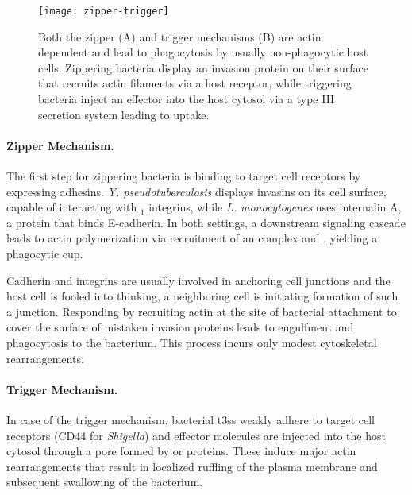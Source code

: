 \begin{figure}
  \centering
  \texttt{[image: zipper-trigger]}
  \caption[Zipper and trigger mechanisms for bacterial host-cell entry]{Both the zipper (A) and trigger mechanisms (B) are actin dependent and lead to phagocytosis by usually non-phagocytic host cells. Zippering bacteria display an invasion protein on their surface that recruits actin filaments via a host receptor, while triggering bacteria inject an effector into the host cytosol via a type III secretion system leading to uptake. \citep{Haglund2011}}
  \label{fig:zipper-trigger}
\end{figure}


\label{zipper-mechanism}

\paragraph{Zipper Mechanism.}
The first step for zippering bacteria is binding to target cell receptors by expressing adhesins. \textit{Y. pseudotuberculosis} displays invasins on its cell surface, capable of interacting with \textbeta$_1$ integrins, while \textit{L. monocytogenes} uses internalin A, a protein that binds E-cadherin. In both settings, a downstream signaling cascade leads to actin polymerization via recruitment of an  complex and , yielding a phagocytic cup.

Cadherin and integrins are usually involved in anchoring cell junctions and the host cell is fooled into thinking, a neighboring cell is initiating formation of such a junction. Responding by recruiting actin at the site of bacterial attachment to cover the surface of mistaken invasion proteins leads to engulfment and phagocytosis to the bacterium. This process incurs only modest cytoskeletal rearrangements. 


\label{trigger-mechanism}

\paragraph{Trigger Mechanism.}
In case of the trigger mechanism, bacterial \gls{t3ss} weakly adhere to target cell receptors (CD44 for \textit{Shigella}) and effector molecules are injected into the host cytosol through a pore formed by  or  proteins. These induce major actin rearrangements that result in localized ruffling of the plasma membrane and subsequent swallowing of the bacterium.

